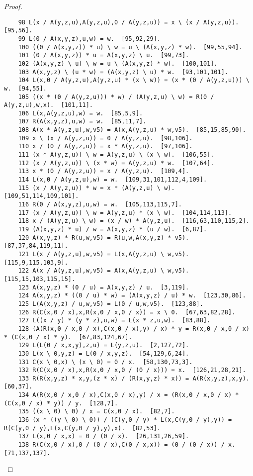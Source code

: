\documentclass[12pt, twoside, openright]{report}
\theoremstyle{definition}
\begin{document}
\begin{proof}
\begin{lstlisting}
    98 L(x / A(y,z,u),A(y,z,u),0 / A(y,z,u)) = x \ (x / A(y,z,u)).  [95,56].
    99 L(0 / A(x,y,z),u,w) = w.  [95,92,29].
    100 ((0 / A(x,y,z)) * u) \ w = u \ (A(x,y,z) * w).  [99,55,94].
    101 (0 / A(x,y,z)) * u = A(x,y,z) \ u.  [99,73].
    102 (A(x,y,z) \ u) \ w = u \ (A(x,y,z) * w).  [100,101].
    103 A(x,y,z) \ (u * w) = (A(x,y,z) \ u) * w.  [93,101,101].
    104 L(x,0 / A(y,z,u),A(y,z,u) * (x \ w)) = (x * (0 / A(y,z,u))) \ w.  [94,55].
    105 ((x * (0 / A(y,z,u))) * w) / (A(y,z,u) \ w) = R(0 / A(y,z,u),w,x).  [101,11].
    106 L(x,A(y,z,u),w) = w.  [85,5,9].
    107 R(A(x,y,z),u,w) = w.  [85,11,7].
    108 A(x * A(y,z,u),w,v5) = A(x,A(y,z,u) * w,v5).  [85,15,85,90].
    109 x \ (x / A(y,z,u)) = 0 / A(y,z,u).  [98,106].
    110 x / (0 / A(y,z,u)) = x * A(y,z,u).  [97,106].
    111 (x * A(y,z,u)) \ w = A(y,z,u) \ (x \ w).  [106,55].
    112 (x / A(y,z,u)) \ (x * w) = A(y,z,u) * w.  [107,64].
    113 x * (0 / A(y,z,u)) = x / A(y,z,u).  [109,4].
    114 L(x,0 / A(y,z,u),w) = w.  [109,31,101,112,4,109].
    115 (x / A(y,z,u)) * w = x * (A(y,z,u) \ w).  [109,51,114,109,101].
    116 R(0 / A(x,y,z),u,w) = w.  [105,113,115,7].
    117 (x / A(y,z,u)) \ w = A(y,z,u) * (x \ w).  [104,114,113].
    118 x / (A(y,z,u) \ w) = (x / w) * A(y,z,u).  [116,63,110,115,2].
    119 (A(x,y,z) * u) / w = A(x,y,z) * (u / w).  [6,87].
    120 A(x,y,z) * R(u,w,v5) = R(u,w,A(x,y,z) * v5).  [87,37,84,119,11].
    121 L(x / A(y,z,u),w,v5) = L(x,A(y,z,u) \ w,v5).  [115,9,115,103,9].
    122 A(x / A(y,z,u),w,v5) = A(x,A(y,z,u) \ w,v5).  [115,15,103,115,15].
    123 A(x,y,z) * (0 / u) = A(x,y,z) / u.  [3,119].
    124 A(x,y,z) * ((0 / u) * w) = (A(x,y,z) / u) * w.  [123,30,86].
    125 L(A(x,y,z) / u,w,v5) = L(0 / u,w,v5).  [123,88].
    126 R(C(x,0 / x),x,R(x,0 / x,0 / x)) = x \ 0.  [67,63,82,28].
    127 L((x / y) * (y * z),u,w) = L(x * z,u,w).  [83,88].
    128 (A(R(x,0 / x,0 / x),C(x,0 / x),y) / x) * y = R(x,0 / x,0 / x) * (C(x,0 / x) * y).  [67,83,124,67].
    129 L(L(0 / x,x,y),z,u) = L(y,z,u).  [2,127,72].
    130 L(x \ 0,y,z) = L(0 / x,y,z).  [54,129,6,24].
    131 C(x \ 0,x) \ (x \ 0) = 0 / x.  [58,130,73,3].
    132 R(C(x,0 / x),x,R(x,0 / x,0 / (0 / x))) = x.  [126,21,28,21].
    133 R(R(x,y,z) * x,y,(z * x) / (R(x,y,z) * x)) = A(R(x,y,z),x,y).  [60,37].
    134 A(R(x,0 / x,0 / x),C(x,0 / x),y) / x = (R(x,0 / x,0 / x) * (C(x,0 / x) * y)) / y.  [128,7].
    135 ((x \ 0) \ 0) / x = C(x,0 / x).  [82,7].
    136 (x * ((y \ 0) \ 0)) / (C(y,0 / y) * L(x,C(y,0 / y),y)) = R(C(y,0 / y),L(x,C(y,0 / y),y),x).  [82,53].
    137 L(x,0 / x,x) = 0 / (0 / x).  [26,131,26,59].
    138 R(C(x,0 / x),0 / (0 / x),C(0 / x,x)) = (0 / (0 / x)) / x.  [71,137,137].

\end{lstlisting}
\end{proof}
\end{document}
